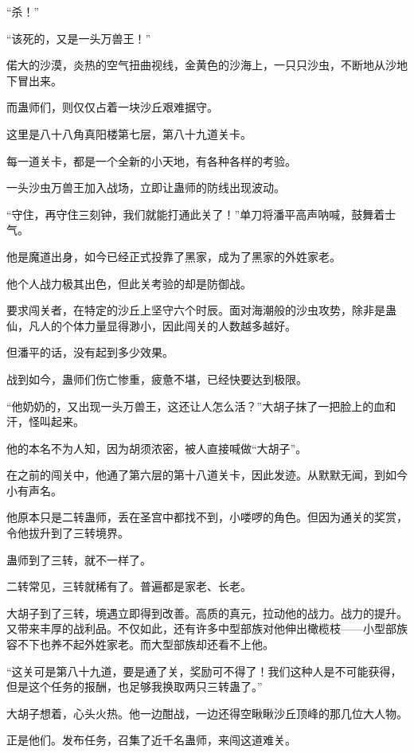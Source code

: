 
\begin{this_body}

“杀！”

“该死的，又是一头万兽王！”

偌大的沙漠，炎热的空气扭曲视线，金黄色的沙海上，一只只沙虫，不断地从沙地下冒出来。

而蛊师们，则仅仅占着一块沙丘艰难据守。

这里是八十八角真阳楼第七层，第八十九道关卡。

每一道关卡，都是一个全新的小天地，有各种各样的考验。

一头沙虫万兽王加入战场，立即让蛊师的防线出现波动。

“守住，再守住三刻钟，我们就能打通此关了！”单刀将潘平高声呐喊，鼓舞着士气。

他是魔道出身，如今已经正式投靠了黑家，成为了黑家的外姓家老。

他个人战力极其出色，但此关考验的却是防御战。

要求闯关者，在特定的沙丘上坚守六个时辰。面对海潮般的沙虫攻势，除非是蛊仙，凡人的个体力量显得渺小，因此闯关的人数越多越好。

但潘平的话，没有起到多少效果。

战到如今，蛊师们伤亡惨重，疲惫不堪，已经快要达到极限。

“他奶奶的，又出现一头万兽王，这还让人怎么活？”大胡子抹了一把脸上的血和汗，怪叫起来。

他的本名不为人知，因为胡须浓密，被人直接喊做“大胡子”。

在之前的闯关中，他通了第六层的第十八道关卡，因此发迹。从默默无闻，到如今小有声名。

他原本只是二转蛊师，丢在圣宫中都找不到，小喽啰的角色。但因为通关的奖赏，令他拔升到了三转境界。

蛊师到了三转，就不一样了。

二转常见，三转就稀有了。普遍都是家老、长老。

大胡子到了三转，境遇立即得到改善。高质的真元，拉动他的战力。战力的提升。又带来丰厚的战利品。不仅如此，还有许多中型部族对他伸出橄榄枝——小型部族容不下也养不起外姓家老。而大型部族却还看不上他。

“这关可是第八十九道，要是通了关，奖励可不得了！我们这种人是不可能获得，但是这个任务的报酬，也足够我换取两只三转蛊了。”

大胡子想着，心头火热。他一边酣战，一边还得空瞅瞅沙丘顶峰的那几位大人物。

正是他们。发布任务，召集了近千名蛊师，来闯这道难关。


\end{this_body}
